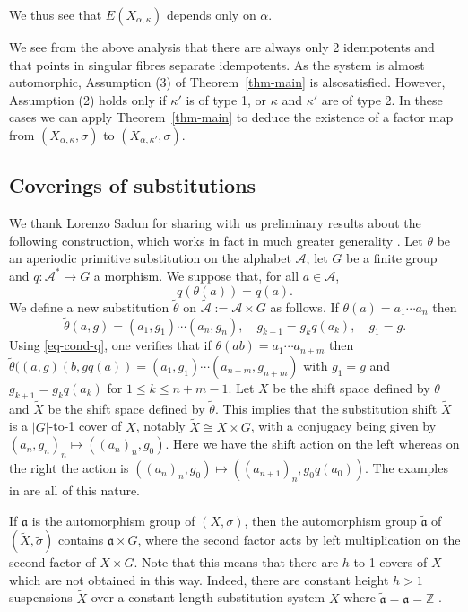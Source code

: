 \documentclass[12pt]{amsart}
\theoremstyle{definition}
\numberwithin{equation}{section}
\newcommand{\Aa}{{\mathcal A}}
\newcommand{\aut}{{\mathfrak a}}
\newcommand{\al}{\alpha}
\newcommand{\cut}{\kappa}
\begin{document}
We thus see that $E(X_{\al,\cut})$ depends only on $\al$. 

We see from the above analysis that there are always only 2 idempotents and that points in singular fibres separate idempotents. As the system is almost automorphic, Assumption (3) of Theorem~\ref{thm-main} is  alsosatisfied. However, Assumption (2) holds only if $\cut'$ is of type 1, or $\cut$ and $\cut'$ are of type 2. In these cases we can apply Theorem~\ref{thm-main} to deduce the existence of a factor map from $(X_{\al,\cut},\sigma)$ to $(X_{\al,\cut'},\sigma)$.  


\subsection{Coverings of substitutions}\label{sec:coverings}
We thank Lorenzo Sadun for sharing with us preliminary results about the following construction, which works in fact in much greater generality \cite{Sadun}.
Let $\theta$ be an aperiodic primitive substitution on the alphabet $\Aa$, let $G$ be a finite group and 
$q:\Aa^*\to G$ a morphism. We suppose that, for all $a\in \Aa$, 
\begin{equation}\label{eq-cond-q}
   q(\theta(a)) = q(a).    
\end{equation}
We define a new substitution $\tilde \theta$ on $\tilde\Aa:=\Aa\times G$ as follows. If $\theta(a) = a_1\cdots a_n$ then
$$\tilde\theta(a,g) = (a_1,g_1)\cdots (a_n,g_n),\quad g_{k+1} = g_k q(a_k),\quad g_1 = g.$$
Using \eqref{eq-cond-q},
 one verifies that if 
$\theta(ab) = a_1\cdots a_{n+m}$ then  
$\tilde\theta((a,g)(b,gq(a)) = (a_1,g_1)\cdots (a_{n+m},g_{n+m})$ with $ g_1 = g$ and $g_{k+1} = g_k q(a_k)$ for  $1\leq k \leq n+m-1$.  Let $X$ be the shift space defined by $\theta$ and $\tilde X$ be the shift space defined by $\tilde \theta$. This implies that the substitution shift $\tilde X$ is a $|G|$-to-1 cover of $ X$, notably  $\tilde X\cong  X\times G$, with a conjugacy being given by $(a_n,g_n)_n\mapsto ((a_n)_n,g_0)$. Here we have the shift action on the left whereas on the right the action is $((a_n)_n,g_0)\mapsto ((a_{n+1})_n,g_0q(a_0))$. The examples in  \cite{BARGE-BRUIN-Jones-Sadun:2012} are all of this nature.


If $\aut$ is the automorphism group  of $ (X,\sigma)$, then the automorphism group $\tilde\aut$ of $(\tilde X,\tilde\sigma)$ contains $\aut\times G$, where the second factor acts by left multiplication on the second factor of $X\times G$. Note that this means that there are $h$-to-1 covers of $ X$ which are not obtained in this way. Indeed, there are constant height $h>1$ suspensions $\tilde X$ over a constant length substitution system $ X$ where $\tilde\aut=\aut=\mathbb Z$ \cite{CQY}. 
\end{document}
